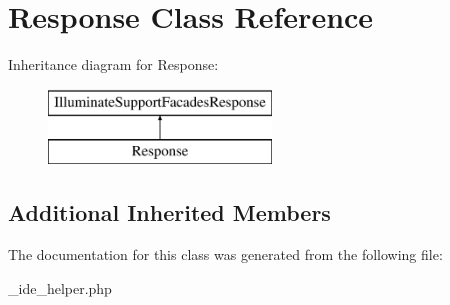 \hypertarget{class_response}{}\section{Response Class Reference}
\label{class_response}
Inheritance diagram for Response\+:\begin{figure}[H]
\begin{center}
\leavevmode
\includegraphics[height=2.000000cm]{class_response}
\end{center}
\end{figure}
\subsection*{Additional Inherited Members}


The documentation for this class was generated from the following file\+:\begin{DoxyCompactItemize}
\item 
\+\_\+ide\+\_\+helper.\+php\end{DoxyCompactItemize}
